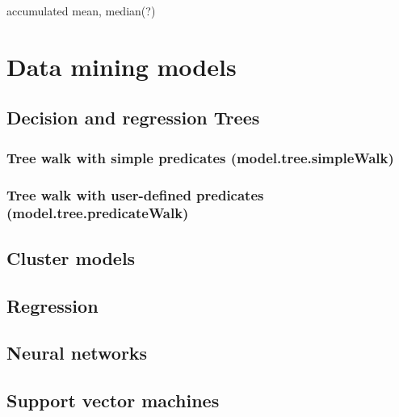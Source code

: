 \documentclass{article}
\theoremstyle{definition}
\begin{document}
accumulated mean, median(?)

\pagebreak

\section{Data mining models}

\subsection{Decision and regression Trees}

\subsubsection{Tree walk with simple predicates (model.tree.simpleWalk)}

\subsubsection{Tree walk with user-defined predicates (model.tree.predicateWalk)}

\subsection{Cluster models}

\subsection{Regression}

\subsection{Neural networks}

\subsection{Support vector machines}
\end{document}
